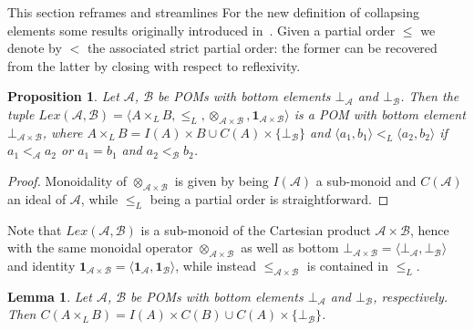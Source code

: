 \documentclass[a4paper]{elsarticle}
\newtheorem{lemma}{Lemma}
\newtheorem{proposition}{Proposition}
\newcommand{\monop}{\otimes}
\newcommand{\1}{\mathbf{1}}
\begin{document}
This section reframes and streamlines For the new definition of collapsing elements some results originally
introduced in~\cite{GadducciHMW13}. Given a partial order $\leq$ we denote by $<$ the associated strict 
partial order: the former can be recovered from the latter by closing with respect to reflexivity.

\begin{proposition}\label{def:lexBI}
	Let $\mathcal{A}$, $\mathcal{B}$ be POMs with bottom elements $\bot_\mathcal{A}$ and $\bot_\mathcal{B}$.
	Then the tuple $Lex(\mathcal{A}, \mathcal{B}) = 
	\langle A \times_L B, \leq_L, \monop_{\mathcal{A} \times \mathcal{B}}, \1_{\mathcal{A} \times \mathcal{B}} \rangle$
	is a POM with bottom element $\bot_{\mathcal{A} \times \mathcal{B}}$,
	where $A \times_L B = I(A) \times B \cup C(A) \times \{\bot_\mathcal{B}\}$ and
		$\langle a_1, b_1\rangle <_L \langle a_2, b_2\rangle$ if $a_1 <_\mathcal{A} a_2$ or $a_1 = b_1$ 
		and  $a_2 <_\mathcal{B} b_2$.
\end{proposition}

\begin{proof}
	Monoidality of $\monop_{\mathcal{A} \times \mathcal{B}}$ is given by being $I(\mathcal{A})$ a sub-monoid
	and $C(\mathcal{A})$ an ideal of $\mathcal{A}$, while $\leq_L$ being a partial order is straightforward.
\end{proof}

Note that $Lex(\mathcal{A},\mathcal{B})$ is a sub-monoid of the Cartesian product $\mathcal{A} \times \mathcal{B}$,
hence with the same monoidal operator $\monop_{\mathcal{A} \times \mathcal{B}}$ as well as 
bottom $\bot_{\mathcal{A} \times \mathcal{B}} = \langle \bot_\mathcal{A}, \bot_\mathcal{B} \rangle$ and
identity $\1_{\mathcal{A} \times \mathcal{B}} = \langle \1_\mathcal{A}, \1_\mathcal{B} \rangle$,
while instead $\leq_{\mathcal{A} \times \mathcal{B}}$ is contained in $\leq_L$.
%

\begin{lemma}
Let $\mathcal{A}$, $\mathcal{B}$ be POMs with bottom elements $\bot_\mathcal{A}$ and $\bot_\mathcal{B}$, 
respectively.
Then $C(A \times_L B) = I(A) \times C(B) \cup C(A) \times \{\bot_\mathcal{B}\}$.
\end{lemma}
\end{document}
